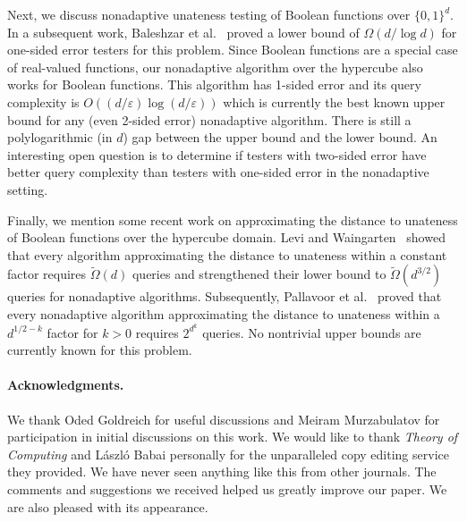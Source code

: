 \documentclass{toc}
\newcommand{\eps}{\varepsilon}
\begin{document}
Next, we discuss nonadaptive unateness testing of Boolean functions over $\{0,1\}^d$. In a subsequent work, Baleshzar et al.~\cite{BCPRS17b} proved a lower bound of $\Omega\left({d}/{\log d} \right)$ for one-sided error testers for this problem.
Since Boolean functions are a special case of real-valued functions,
our nonadaptive algorithm over the hypercube also works for Boolean functions.
This algorithm has 1-sided error and its query complexity  is $O\left(({d}/{\eps})\log ({d}/{\eps})\right)$ which is currently the best known upper bound for any (even 2-sided error) nonadaptive algorithm. There is still a polylogarithmic (in $d$) gap between the upper bound and the lower bound.
An interesting open question is to determine if testers with two-sided error have better query complexity than testers with one-sided error in the nonadaptive setting.
%

Finally, we mention some recent work on approximating the distance to unateness of Boolean functions over the hypercube domain. Levi and Waingarten~\cite{LW19} showed that every algorithm approximating the distance to unateness within a constant factor requires $\widetilde{\Omega}(d)$ queries and strengthened their lower bound to $\widetilde{\Omega}(d^{3/2})$ queries for nonadaptive algorithms. Subsequently, Pallavoor et al.~\cite{PRW20} proved that every nonadaptive algorithm approximating the distance to unateness within a $d^{1/2 - k}$ factor for $k > 0$ requires $2^{d^k}$ queries. No nontrivial upper bounds are currently known for this problem.

\paragraph{Acknowledgments.} We thank Oded Goldreich for useful discussions and Meiram Murzabulatov for participation in initial discussions on this work.
%
We would like to thank \emph{Theory of Computing} and L\'aszl\'o Babai 
personally
for the unparalleled copy editing service they provided. We have never seen
anything like this from other journals. The comments and suggestions we
received helped us greatly improve our paper. We are also pleased with its
appearance. 


%
%
%

%
\end{document}
